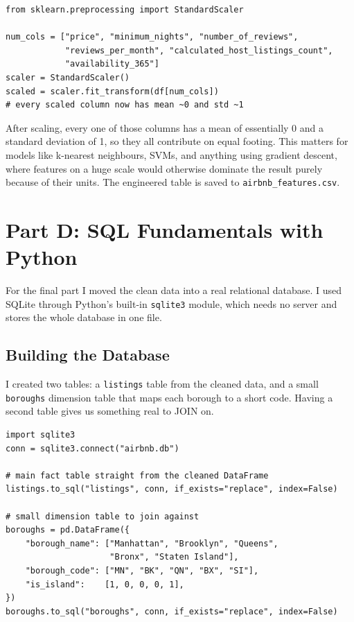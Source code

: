 \documentclass[11pt,a4paper]{article}
\begin{document}
\begin{lstlisting}[style=py, caption={Standardizing the numeric features.}]
from sklearn.preprocessing import StandardScaler

num_cols = ["price", "minimum_nights", "number_of_reviews",
            "reviews_per_month", "calculated_host_listings_count",
            "availability_365"]
scaler = StandardScaler()
scaled = scaler.fit_transform(df[num_cols])
# every scaled column now has mean ~0 and std ~1
\end{lstlisting}

After scaling, every one of those columns has a mean of essentially 0 and a standard deviation of 1, so they all contribute on equal footing. This matters for models like k-nearest neighbours, SVMs, and anything using gradient descent, where features on a huge scale would otherwise dominate the result purely because of their units. The engineered table is saved to \texttt{airbnb\_features.csv}.

\section*{Part D: SQL Fundamentals with Python}
For the final part I moved the clean data into a real relational database. I used SQLite through Python's built-in \texttt{sqlite3} module, which needs no server and stores the whole database in one file.

\subsection*{Building the Database}
I created two tables: a \texttt{listings} table from the cleaned data, and a small \texttt{boroughs} dimension table that maps each borough to a short code. Having a second table gives us something real to JOIN on.

\begin{lstlisting}[style=py, caption={Creating the SQLite database from the cleaned DataFrame.}]
import sqlite3
conn = sqlite3.connect("airbnb.db")

# main fact table straight from the cleaned DataFrame
listings.to_sql("listings", conn, if_exists="replace", index=False)

# small dimension table to join against
boroughs = pd.DataFrame({
    "borough_name": ["Manhattan", "Brooklyn", "Queens",
                     "Bronx", "Staten Island"],
    "borough_code": ["MN", "BK", "QN", "BX", "SI"],
    "is_island":    [1, 0, 0, 0, 1],
})
boroughs.to_sql("boroughs", conn, if_exists="replace", index=False)
\end{lstlisting}
\end{document}
